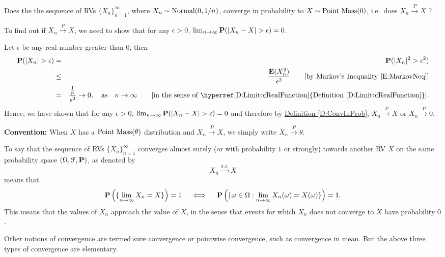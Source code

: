 \begin{example}\label{EX:Normal01bynConvinProbToPointMass0}
Does the the sequence of RVs $\{X_n\}_{n=1}^{\infty}$, where $X_n \sim \mbox{{\rm Normal}}(0,1/n)$, converge in probability to $X \sim \mbox{{\rm Point~Mass}}(0)$, i.e.~does $X_n \overset{P}{\longrightarrow} X$ ?

To find out if $X_n \overset{P}{\longrightarrow} X$, we need to show that for any $\epsilon >0$, $\lim_{n \to \infty} \p(|X_n-X|>\epsilon)=0$.

Let $\epsilon$ be any real number greater than $0$, then
\begin{eqnarray}
\p(|X_n|>\epsilon) &=& \p(|X_n|^2 > \epsilon^2) \notag \\
&\leq& \frac{\e(X_n^2)}{\epsilon^2} \qquad \text{[by Markov's Inequality \eqref{E:MarkovNeq}]} \notag \\
&=& \frac{\frac{1}{n}}{\epsilon^2} \to 0, \quad \text{as} \quad n \to \infty \qquad \text{[in the sense of \hyperref[D:LimitofRealFunction]{Definition \ref*{D:LimitofRealFunction}}].} \notag
\end{eqnarray}
Hence, we have shown that for any $\epsilon >0$, $\lim_{n \to \infty} \p(|X_n-X|>\epsilon)=0$ and therefore by \hyperref[D:ConvInProb]{Definition \ref*{D:ConvInProb}}, $X_n \overset{P}{\longrightarrow} X$ or $X_n \overset{P}{\longrightarrow} 0$.  

{\scriptsize
{\bf Convention:} When $X$ has a $\mbox{{\rm Point~Mass}}(\theta)$ distribution and $X_n \overset{P}{\longrightarrow} X$, we simply write $X_n \overset{P}{\longrightarrow} \theta$.
}
\end{example}

\begin{definition}
To say that the sequence of RVs $\{X_n\}_{n=1}^{\infty}$ converges almost surely (or with probability $1$ or strongly) towards another RV $X$ on the same probability space $(\Omega,\mathcal{F},\mathbf{P})$, as denoted by
\[
X_n \overset{a.s.}{\to} X
\]
means that
\[
\mathbf{P} \left( \{ \lim_{n \to \infty} X_n = X \} \right) = 1 \quad \iff \quad \mathbf{P} \left( \{\omega \in \Omega : \lim_{n \to \infty} X_n(\omega) = X(\omega)\} \right) = 1.
\]
This means that the values of $X_n$ approach the value of $X$, in the sense that events for which $X_n$ does not converge to $X$ have probability $0$.
\end{definition}

Other notions of convergence are termed sure convergence or pointwise convergence, such as convergence in mean. 
But the above three types of convergence are elementary. %

